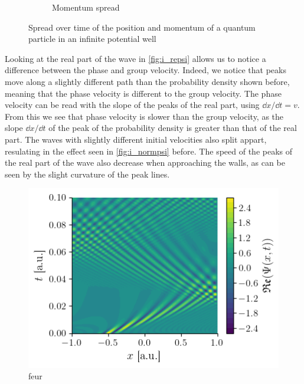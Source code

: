 \begin{figure}[h]
\begin{subfigure}{0.48\linewidth}
        \caption{Momentum spread}
        \label{fig:i_deltap}
    \end{subfigure}
    \caption{Spread over time of the position and momentum of a quantum particle in an infinite potential well}
    \label{fig:i_deltax_deltap}
\end{figure}

Looking at the real part of the wave in \autoref{fig:i_repsi} allows us to notice a difference between the phase and group velocity. Indeed, we notice that peaks move along a slightly different path than the probability density shown before, meaning that the phase velocity is different to the group velocity. The phase velocity can be read with the slope of the peaks of the real part, using \(\dd x / \dd t = v\). From this we see that phase velocity is slower than the group velocity, as the slope \(\dd x / \dd t\) of the peak of the probability density is greater than that of the real part. The waves with slightly different initial velocities also split appart, resulating in the effect seen in \autoref{fig:i_normpsi} before. The speed of the peaks of the real part of the wave also decrease when approaching the walls, as can be seen by the slight curvature of the peak lines.

\begin{figure}[h]
    \centering
    \includegraphics[width=0.6\linewidth]{figures/i_repsi.png}
    \caption{feur}
    \label{fig:i_repsi}
\end{figure}

